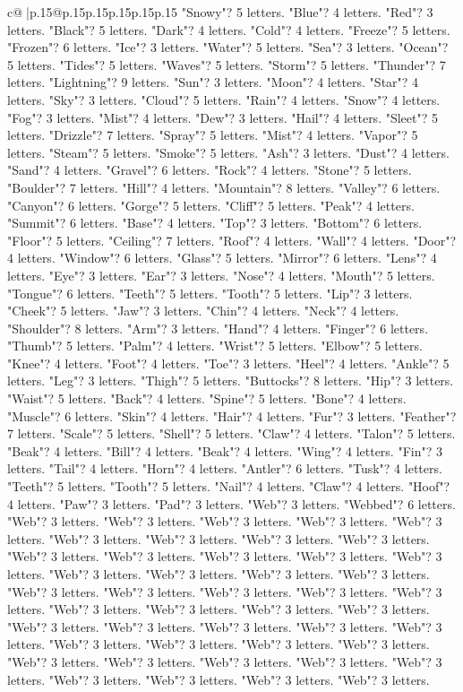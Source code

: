 \documentclass{article}
\begin{document}
{\begin{supertabular}{c@{$\;$}|p{.15\linewidth}@{}p{.15\linewidth}p{.15\linewidth}p{.15\linewidth}p{.15\linewidth}p{.15\linewidth}}
{{{"Snowy"? 5 letters. "Blue"? 4 letters. "Red"? 3 letters. "Black"? 5 letters. "Dark"? 4 letters. "Cold"? 4 letters. "Freeze"? 5 letters. "Frozen"? 6 letters. "Ice"? 3 letters. "Water"? 5 letters. "Sea"? 3 letters. "Ocean"? 5 letters. "Tides"? 5 letters. "Waves"? 5 letters. "Storm"? 5 letters. "Thunder"? 7 letters. "Lightning"? 9 letters. "Sun"? 3 letters. "Moon"? 4 letters. "Star"? 4 letters. "Sky"? 3 letters. "Cloud"? 5 letters. "Rain"? 4 letters. "Snow"? 4 letters. "Fog"? 3 letters. "Mist"? 4 letters. "Dew"? 3 letters. "Hail"? 4 letters. "Sleet"? 5 letters. "Drizzle"? 7 letters. "Spray"? 5 letters. "Mist"? 4 letters. "Vapor"? 5 letters. "Steam"? 5 letters. "Smoke"? 5 letters. "Ash"? 3 letters. "Dust"? 4 letters. "Sand"? 4 letters. "Gravel"? 6 letters. "Rock"? 4 letters. "Stone"? 5 letters. "Boulder"? 7 letters. "Hill"? 4 letters. "Mountain"? 8 letters. "Valley"? 6 letters. "Canyon"? 6 letters. "Gorge"? 5 letters. "Cliff"? 5 letters. "Peak"? 4 letters. "Summit"? 6 letters. "Base"? 4 letters. "Top"? 3 letters. "Bottom"? 6 letters. "Floor"? 5 letters. "Ceiling"? 7 letters. "Roof"? 4 letters. "Wall"? 4 letters. "Door"? 4 letters. "Window"? 6 letters. "Glass"? 5 letters. "Mirror"? 6 letters. "Lens"? 4 letters. "Eye"? 3 letters. "Ear"? 3 letters. "Nose"? 4 letters. "Mouth"? 5 letters. "Tongue"? 6 letters. "Teeth"? 5 letters. "Tooth"? 5 letters. "Lip"? 3 letters. "Cheek"? 5 letters. "Jaw"? 3 letters. "Chin"? 4 letters. "Neck"? 4 letters. "Shoulder"? 8 letters. "Arm"? 3 letters. "Hand"? 4 letters. "Finger"? 6 letters. "Thumb"? 5 letters. "Palm"? 4 letters. "Wrist"? 5 letters. "Elbow"? 5 letters. "Knee"? 4 letters. "Foot"? 4 letters. "Toe"? 3 letters. "Heel"? 4 letters. "Ankle"? 5 letters. "Leg"? 3 letters. "Thigh"? 5 letters. "Buttocks"? 8 letters. "Hip"? 3 letters. "Waist"? 5 letters. "Back"? 4 letters. "Spine"? 5 letters. "Bone"? 4 letters. "Muscle"? 6 letters. "Skin"? 4 letters. "Hair"? 4 letters. "Fur"? 3 letters. "Feather"? 7 letters. "Scale"? 5 letters. "Shell"? 5 letters. "Claw"? 4 letters. "Talon"? 5 letters. "Beak"? 4 letters. "Bill"? 4 letters. "Beak"? 4 letters. "Wing"? 4 letters. "Fin"? 3 letters. "Tail"? 4 letters. "Horn"? 4 letters. "Antler"? 6 letters. "Tusk"? 4 letters. "Teeth"? 5 letters. "Tooth"? 5 letters. "Nail"? 4 letters. "Claw"? 4 letters. "Hoof"? 4 letters. "Paw"? 3 letters. "Pad"? 3 letters. "Web"? 3 letters. "Webbed"? 6 letters. "Web"? 3 letters. "Web"? 3 letters. "Web"? 3 letters. "Web"? 3 letters. "Web"? 3 letters. "Web"? 3 letters. "Web"? 3 letters. "Web"? 3 letters. "Web"? 3 letters. "Web"? 3 letters. "Web"? 3 letters. "Web"? 3 letters. "Web"? 3 letters. "Web"? 3 letters. "Web"? 3 letters. "Web"? 3 letters. "Web"? 3 letters. "Web"? 3 letters. "Web"? 3 letters. "Web"? 3 letters. "Web"? 3 letters. "Web"? 3 letters. "Web"? 3 letters. "Web"? 3 letters. "Web"? 3 letters. "Web"? 3 letters. "Web"? 3 letters. "Web"? 3 letters. "Web"? 3 letters. "Web"? 3 letters. "Web"? 3 letters. "Web"? 3 letters. "Web"? 3 letters. "Web"? 3 letters. "Web"? 3 letters. "Web"? 3 letters. "Web"? 3 letters. "Web"? 3 letters. "Web"? 3 letters. "Web"? 3 letters. "Web"? 3 letters. "Web"? 3 letters. "Web"? 3 letters. "Web"? 3 letters. "Web"? 3 letters. }}}
\end{supertabular}}
\end{document}
